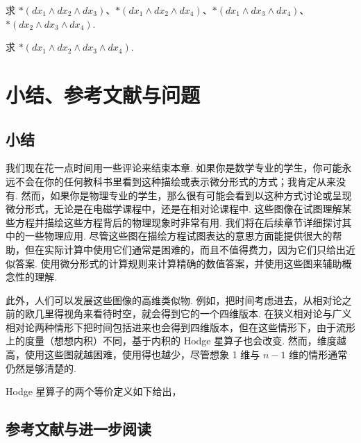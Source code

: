 \begin{question}\label{q:5-31}
求 $*(dx_1\wedge dx_2\wedge dx_3)$、$*(dx_1\wedge dx_2\wedge dx_4)$、$*(dx_1\wedge dx_3\wedge dx_4)$、$*(dx_2\wedge dx_3\wedge dx_4)$.
\end{question}

\begin{question}\label{q:5-32}
求 $*(dx_1\wedge dx_2\wedge dx_3\wedge dx_4)$.
\end{question}

\section{小结、参考文献与问题}

\subsection{小结}

我们现在花一点时间用一些评论来结束本章. 如果你是数学专业的学生，你可能永远不会在你的任何教科书里看到这种描绘或表示微分形式的方式；我肯定从来没有. 然而，如果你是物理专业的学生，那么很有可能会看到以这种方式讨论或呈现微分形式，无论是在电磁学课程中，还是在相对论课程中. 这些图像在试图理解某些方程并描绘这些方程背后的物理现象时非常有用. 我们将在后续章节详细探讨其中的一些物理应用. 尽管这些图在描绘方程试图表达的意思方面能提供很大的帮助，但在实际计算中使用它们通常是困难的，而且不值得费力，因为它们只给出近似答案. 使用微分形式的计算规则来计算精确的数值答案，并使用这些图来辅助概念性的理解.

此外，人们可以发展这些图像的高维类似物. 例如，把时间考虑进去，从相对论之前的欧几里得视角来看待时空，就会得到它的一个四维版本. 在狭义相对论与广义相对论两种情形下把时间包括进来也会得到四维版本，但在这些情形下，由于流形上的度量（想想内积）不同，基于内积的 Hodge 星算子也会改变. 然而，维度越高，使用这些图就越困难，使用得也越少，尽管想象 1 维与 $n-1$ 维的情形通常仍然是够清楚的.

Hodge 星算子的两个等价定义如下给出，
\begin{center}
\end{center}

\subsection{参考文献与进一步阅读}


